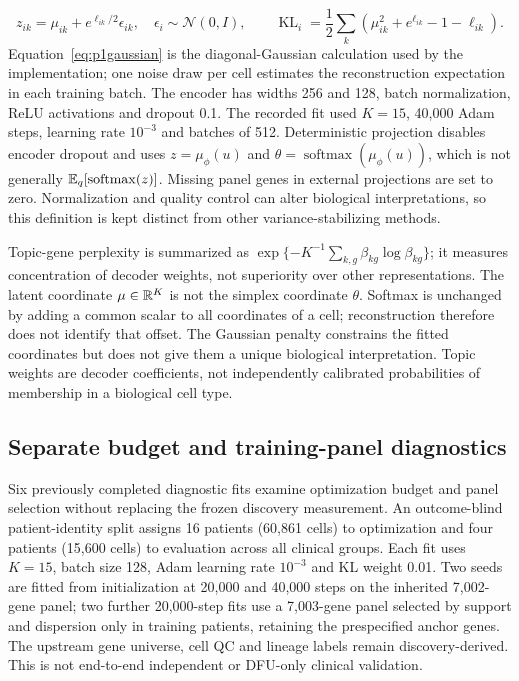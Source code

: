 \documentclass[10pt,a4paper]{article}
\begin{document}
\begin{equation}
z_{ik}=\mu_{ik}+e^{\ell_{ik}/2}\epsilon_{ik},\quad \epsilon_i\sim\mathcal N(0,I),\qquad
\operatorname{KL}_i=\frac12\sum_k\left(\mu_{ik}^2+e^{\ell_{ik}}-1-\ell_{ik}\right).\label{eq:p1gaussian}
\end{equation}
Equation~\eqref{eq:p1gaussian} is the diagonal-Gaussian calculation used by the implementation; one noise draw per cell estimates the reconstruction expectation in each training batch. The encoder has widths 256 and 128, batch normalization, ReLU activations and dropout 0.1. The recorded fit used $K=15$, 40,000 Adam steps, learning rate $10^{-3}$ and batches of 512. Deterministic projection disables encoder dropout and uses $z=\mu_\phi(u)$ and $\theta=\operatorname{softmax}(\mu_\phi(u))$, which is not generally $\mathbb{E}_q[\operatorname{softmax}(z)]$. Missing panel genes in external projections are set to zero. Normalization and quality control can alter biological interpretations, so this definition is kept distinct from other variance-stabilizing methods.

Topic-gene perplexity is summarized as $\exp\{-K^{-1}\sum_{k,g}\beta_{kg}\log\beta_{kg}\}$; it measures concentration of decoder weights, not superiority over other representations. The latent coordinate $\mu\in\mathbb{R}^K$ is not the simplex coordinate $\theta$. Softmax is unchanged by adding a common scalar to all coordinates of a cell; reconstruction therefore does not identify that offset. The Gaussian penalty constrains the fitted coordinates but does not give them a unique biological interpretation. Topic weights are decoder coefficients, not independently calibrated probabilities of membership in a biological cell type.

\subsection{Separate budget and training-panel diagnostics}
Six previously completed diagnostic fits examine optimization budget and panel selection without replacing the frozen discovery measurement. An outcome-blind patient-identity split assigns 16 patients (60,861 cells) to optimization and four patients (15,600 cells) to evaluation across all clinical groups. Each fit uses $K=15$, batch size 128, Adam learning rate $10^{-3}$ and KL weight 0.01. Two seeds are fitted from initialization at 20,000 and 40,000 steps on the inherited 7,002-gene panel; two further 20,000-step fits use a 7,003-gene panel selected by support and dispersion only in training patients, retaining the prespecified anchor genes. The upstream gene universe, cell QC and lineage labels remain discovery-derived. This is not end-to-end independent or DFU-only clinical validation.
\end{document}
